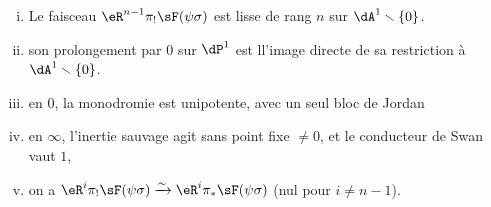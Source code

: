 \begin{theorem_}\label{VI:7-8}
\begin{enumerate}[(i)]
  \item Le faisceau $\eR^{n-1}\pi_! \sF(\psi\sigma)$ est lisse de rang $n$ sur 
    $\dA^1\setminus \{0\}$. 
  \item son prolongement par $0$ sur $\dP^1$ est ll'image directe de sa 
    restriction à $\dA^1\setminus \{0\}$. 
  \item en $0$, la monodromie est unipotente, avec un seul bloc de Jordan
  \item en $\infty$, l'inertie sauvage agit sans point fixe $\ne 0$, et le 
    conducteur de Swan vaut $1$, 
  \item on a $\eR^i \pi_! \sF(\psi\sigma) \iso \eR^i \pi_\ast \sF(\psi\sigma)$ 
    (nul pour $i\ne n-1$).
\end{enumerate}
\end{theorem_}
